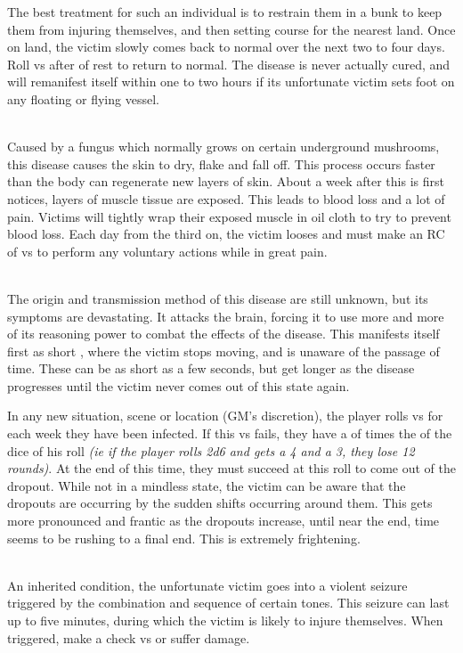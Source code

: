 \begin{multicols*}{2}
The best treatment for such an individual is to restrain them in a bunk to keep them from injuring themselves, and then setting course for the nearest land. Once on land, the victim slowly comes back to normal over the next two to four days. Roll  vs \HEA after  of rest to return to normal. The disease is never actually cured, and will remanifest itself within one to two hours if its unfortunate victim sets foot on any floating or flying vessel.

\\
Caused by a fungus which normally grows on certain underground mushrooms, this disease causes the skin to dry, flake and fall off. This process occurs faster than the body can regenerate new layers of skin. About a week after this is first notices, layers of muscle tissue are exposed. This leads to blood loss and a lot of pain. Victims will tightly wrap their exposed muscle in oil cloth to try to prevent blood loss. Each day from the third on, the victim looses  \DP and must make an RC of  vs \WIL to perform any voluntary actions while in great pain.

\\
The origin and transmission method of this disease are still unknown, but its symptoms are devastating. It attacks the brain, forcing it to use more and more of its reasoning power to combat the effects of the disease. This manifests itself first as short , where the victim stops moving, and is unaware of the passage of time. These can be as short as a few seconds, but get longer as the disease progresses until the victim never comes out of this state again.

In any new situation, scene or location (GM's discretion), the player rolls  vs \WIL for each week they have been infected. If this \RC vs \WIL fails, they have a  of  times the  of the dice of his roll \textit{(ie if the player rolls 2d6 and gets a 4 and a 3, they lose 12 rounds)}. At the end of this time, they must succeed at this roll to come out of the dropout. While not in a mindless state, the victim can be aware that the dropouts are occurring by the sudden shifts occurring around them. This gets more pronounced and frantic as the dropouts increase, until near the end, time seems to be rushing to a final end. This is extremely frightening.

\\
An inherited condition, the unfortunate victim goes into a violent seizure triggered by the combination and sequence of certain tones. This seizure can last up to five minutes, during which the victim is likely to injure themselves. When triggered, make a  check vs \HEA or suffer  \DP damage.


\end{multicols*}
